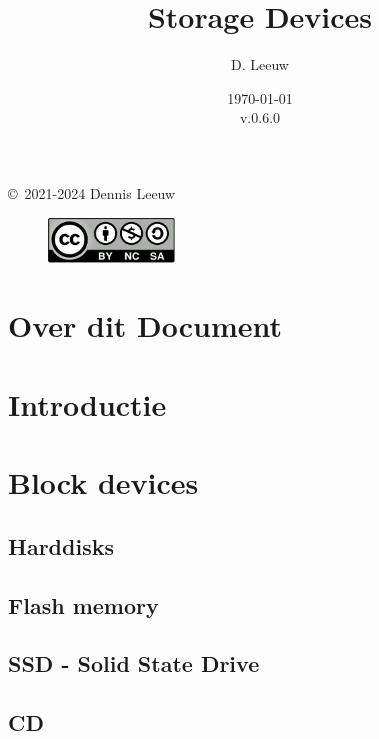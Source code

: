 \documentclass[a4paper,12pt,twoside,openright,titlepage]{book}
\author{D. Leeuw}
\title{Storage Devices}
\date{\today\\v.0.6.0}
\begin{document}

\maketitle

\copyright\ 2021-2024 Dennis Leeuw\\

\begin{figure}
\includegraphics[width=0.3\textwidth]{CC-BY-SA-NC.png}
\end{figure}

\bigskip




\frontmatter
\chapter{Over dit Document}

\tableofcontents

\mainmatter

\chapter{Introductie}


\chapter{Block devices}

\section{Harddisks}

\section{Flash memory}

\section{SSD - Solid State Drive}

\section{CD}
\end{document}
